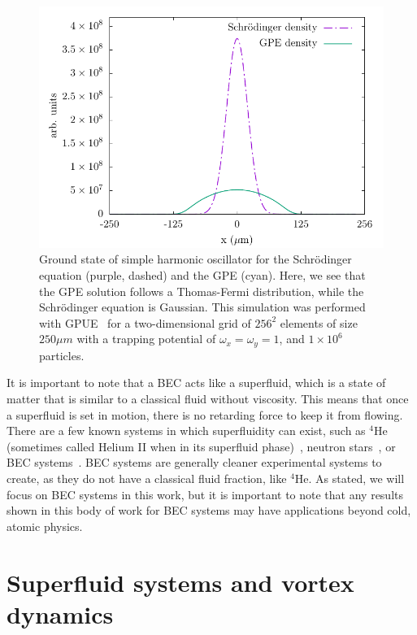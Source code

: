 \begin{figure}
\center \includegraphics[width = \textwidth]{data/qs/SHO/SHO.pdf}

\caption{Ground state of simple harmonic oscillator for the Schr\"odinger equation (purple, dashed) and the GPE (cyan).
Here, we see that the GPE solution follows a Thomas-Fermi distribution, while the Schr\"odinger equation is Gaussian.
This simulation was performed with GPUE~\cite{schloss2018} for a two-dimensional grid of $256^2$ elements of size $250 \mu m$ with a trapping potential of $\omega_x = \omega_y = 1$, and $1\times 10^6$ particles.}
\label{fig:TF}
\end{figure}

It is important to note that a BEC acts like a superfluid, which is a state of matter that is similar to a classical fluid without viscosity.
This means that once a superfluid is set in motion, there is no retarding force to keep it from flowing.
There are a few known systems in which superfluidity can exist, such as $^4$He (sometimes called Helium II when in its superfluid phase)~\cite{allen1938}, neutron stars~\cite{migdal1960}, or BEC systems~\cite{einstein1925, anderson1995}.
BEC systems are generally cleaner experimental systems to create, as they do not have a classical fluid fraction, like $^4$He.
As stated, we will focus on BEC systems in this work, but it is important to note that any results shown in this body of work for BEC systems may have applications beyond cold, atomic physics.

\section{Superfluid systems and vortex dynamics}

